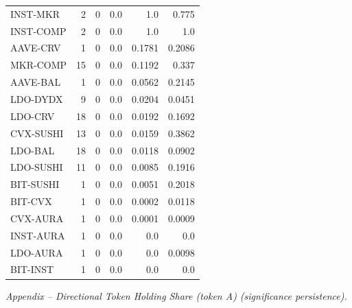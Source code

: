 \begin{table}[!ht]
{\begin{tabular}{lrrrrr}
INST-MKR & 2 & 0 & 0.0 & 1.0 & 0.775 \\
INST-COMP & 2 & 0 & 0.0 & 1.0 & 1.0 \\
AAVE-CRV & 1 & 0 & 0.0 & 0.1781 & 0.2086 \\
MKR-COMP & 15 & 0 & 0.0 & 0.1192 & 0.337 \\
AAVE-BAL & 1 & 0 & 0.0 & 0.0562 & 0.2145 \\
LDO-DYDX & 9 & 0 & 0.0 & 0.0204 & 0.0451 \\
LDO-CRV & 18 & 0 & 0.0 & 0.0192 & 0.1692 \\
CVX-SUSHI & 13 & 0 & 0.0 & 0.0159 & 0.3862 \\
LDO-BAL & 18 & 0 & 0.0 & 0.0118 & 0.0902 \\
LDO-SUSHI & 11 & 0 & 0.0 & 0.0085 & 0.1916 \\
BIT-SUSHI & 1 & 0 & 0.0 & 0.0051 & 0.2018 \\
BIT-CVX & 1 & 0 & 0.0 & 0.0002 & 0.0118 \\
CVX-AURA & 1 & 0 & 0.0 & 0.0001 & 0.0009 \\
INST-AURA & 1 & 0 & 0.0 & 0.0 & 0.0 \\
LDO-AURA & 1 & 0 & 0.0 & 0.0 & 0.0098 \\
BIT-INST & 1 & 0 & 0.0 & 0.0 & 0.0 \\
\hline
\end{tabular}
}
\vspace{2mm}\textit{Appendix – Directional Token Holding Share (token A) (significance persistence).}
\end{table}